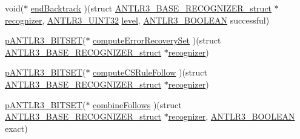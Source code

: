 \begin{DoxyCompactItemize}
\item 
void($\ast$ \hyperlink{struct_a_n_t_l_r3___b_a_s_e___r_e_c_o_g_n_i_z_e_r__struct_aceb67f83ec3eb1ff97e4bc858aa29895}{end\-Backtrack} )(struct \hyperlink{struct_a_n_t_l_r3___b_a_s_e___r_e_c_o_g_n_i_z_e_r__struct}{A\-N\-T\-L\-R3\-\_\-\-B\-A\-S\-E\-\_\-\-R\-E\-C\-O\-G\-N\-I\-Z\-E\-R\-\_\-struct} $\ast$\hyperlink{struct_a_n_t_l_r3___b_a_s_e___r_e_c_o_g_n_i_z_e_r__struct_aa7ab273aa44860cea6cd6e41528b57af}{recognizer}, \hyperlink{antlr3defs_8h_ac41f744abd0fd25144b9eb9d11b1dfd1}{A\-N\-T\-L\-R3\-\_\-\-U\-I\-N\-T32} \hyperlink{_read_d_m3___matlab_8m_afde8e18a788ccc92fc61cab298bca7e3}{level}, \hyperlink{antlr3defs_8h_a5b33dccbba3b7212539695e21df4079b}{A\-N\-T\-L\-R3\-\_\-\-B\-O\-O\-L\-E\-A\-N} successful)
\item 
\hyperlink{antlr3interfaces_8h_ab15ce244874643afe4a952daf417f744}{p\-A\-N\-T\-L\-R3\-\_\-\-B\-I\-T\-S\-E\-T}($\ast$ \hyperlink{struct_a_n_t_l_r3___b_a_s_e___r_e_c_o_g_n_i_z_e_r__struct_a91345696da39e74211e056303572197a}{compute\-Error\-Recovery\-Set} )(struct \hyperlink{struct_a_n_t_l_r3___b_a_s_e___r_e_c_o_g_n_i_z_e_r__struct}{A\-N\-T\-L\-R3\-\_\-\-B\-A\-S\-E\-\_\-\-R\-E\-C\-O\-G\-N\-I\-Z\-E\-R\-\_\-struct} $\ast$\hyperlink{struct_a_n_t_l_r3___b_a_s_e___r_e_c_o_g_n_i_z_e_r__struct_aa7ab273aa44860cea6cd6e41528b57af}{recognizer})
\item 
\hyperlink{antlr3interfaces_8h_ab15ce244874643afe4a952daf417f744}{p\-A\-N\-T\-L\-R3\-\_\-\-B\-I\-T\-S\-E\-T}($\ast$ \hyperlink{struct_a_n_t_l_r3___b_a_s_e___r_e_c_o_g_n_i_z_e_r__struct_a795ea57e517a9fdcd05d070a7b59bf47}{compute\-C\-S\-Rule\-Follow} )(struct \hyperlink{struct_a_n_t_l_r3___b_a_s_e___r_e_c_o_g_n_i_z_e_r__struct}{A\-N\-T\-L\-R3\-\_\-\-B\-A\-S\-E\-\_\-\-R\-E\-C\-O\-G\-N\-I\-Z\-E\-R\-\_\-struct} $\ast$\hyperlink{struct_a_n_t_l_r3___b_a_s_e___r_e_c_o_g_n_i_z_e_r__struct_aa7ab273aa44860cea6cd6e41528b57af}{recognizer})
\item 
\hyperlink{antlr3interfaces_8h_ab15ce244874643afe4a952daf417f744}{p\-A\-N\-T\-L\-R3\-\_\-\-B\-I\-T\-S\-E\-T}($\ast$ \hyperlink{struct_a_n_t_l_r3___b_a_s_e___r_e_c_o_g_n_i_z_e_r__struct_aad66611bf89411191906542a35c1e051}{combine\-Follows} )(struct \hyperlink{struct_a_n_t_l_r3___b_a_s_e___r_e_c_o_g_n_i_z_e_r__struct}{A\-N\-T\-L\-R3\-\_\-\-B\-A\-S\-E\-\_\-\-R\-E\-C\-O\-G\-N\-I\-Z\-E\-R\-\_\-struct} $\ast$\hyperlink{struct_a_n_t_l_r3___b_a_s_e___r_e_c_o_g_n_i_z_e_r__struct_aa7ab273aa44860cea6cd6e41528b57af}{recognizer}, \hyperlink{antlr3defs_8h_a5b33dccbba3b7212539695e21df4079b}{A\-N\-T\-L\-R3\-\_\-\-B\-O\-O\-L\-E\-A\-N} exact)
\item 

\end{DoxyCompactItemize}

